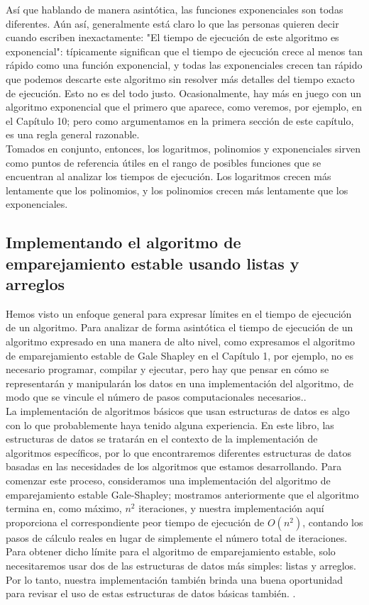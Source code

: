\documentclass[a4paper]{article}
\begin{document}
Así que hablando de manera asintótica, las funciones exponenciales son todas diferentes. Aún así, generalmente está claro lo que las personas quieren decir cuando escriben inexactamente: "El tiempo de ejecución de este algoritmo es exponencial": típicamente significan que el tiempo de ejecución crece al menos tan rápido como una función exponencial, y todas las exponenciales crecen tan rápido que podemos descarte este algoritmo sin resolver más detalles del tiempo exacto de ejecución. Esto no es del todo justo. Ocasionalmente, hay más en juego con un algoritmo exponencial que el primero que aparece, como veremos, por ejemplo, en el Capítulo 10; pero como argumentamos en la primera sección de este capítulo, es una regla general razonable.\\

Tomados en conjunto, entonces, los logaritmos, polinomios y exponenciales sirven como puntos de referencia útiles en el rango de posibles funciones que se encuentran al analizar los tiempos de ejecución. Los logaritmos crecen más lentamente que los polinomios, y los polinomios crecen más lentamente que los exponenciales.\\

\subsection{Implementando el algoritmo de emparejamiento estable usando listas y arreglos}

Hemos visto un enfoque general para expresar límites en el tiempo de ejecución de un algoritmo. Para analizar de forma asintótica el tiempo de ejecución de un algoritmo expresado en una manera de alto nivel, como expresamos el algoritmo de emparejamiento estable de Gale Shapley en el Capítulo 1, por ejemplo, no es necesario programar, compilar y ejecutar, pero hay que pensar en cómo se representarán y manipularán los datos en una implementación del algoritmo, de modo que se vincule el número de pasos computacionales necesarios..\\

La implementación de algoritmos básicos que usan estructuras de datos es algo con lo que probablemente haya tenido alguna experiencia. En este libro, las estructuras de datos se tratarán en el contexto de la implementación de algoritmos específicos, por lo que encontraremos diferentes estructuras de datos basadas en las necesidades de los algoritmos que estamos desarrollando. Para comenzar este proceso,
consideramos una implementación del algoritmo de emparejamiento estable Gale-Shapley;
mostramos anteriormente que el algoritmo termina en, como máximo, $n^2$ iteraciones, y nuestra
implementación aquí proporciona el correspondiente peor tiempo de ejecución de $O (n^2)$, contando los pasos de cálculo reales en lugar de simplemente el número total de iteraciones. Para obtener dicho límite para el algoritmo de emparejamiento estable, solo necesitaremos usar dos de las estructuras de datos más simples: listas y arreglos. Por lo tanto, nuestra implementación también brinda una buena oportunidad para revisar el uso de estas estructuras de datos básicas también. .\\
\end{document}

